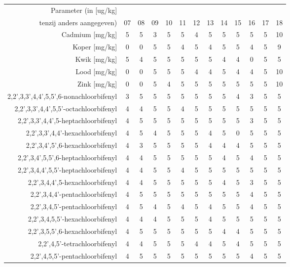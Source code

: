 \begin{tabular}{ r |c | c | c | c | c |c | c | c | c | c | c | c } 
\rowcolor[HTML]{EFEFEF}  
Parameter (in [ug/kg] &  &  &  &  &  &  &  &  &  &  &  & \\\rowcolor[HTML]{EFEFEF}  
 tenzij anders aangegeven) & 07 & 08 & 09 & 10 & 11 & 12 & 13 & 14 & 15 & 16 & 17 & 18 \\    \hline     
Cadmium [mg/kg] &5 & 5 & 3 & 5 & 5 & 4 & 5 & 5 & 5 & 5 & 5 & 10 \\
Koper [mg/kg] &0 & 0 & 5 & 5 & 4 & 5 & 4 & 5 & 5 & 4 & 5 & 9 \\
Kwik [mg/kg] &5 & 4 & 5 & 5 & 5 & 5 & 5 & 4 & 4 & 0 & 5 & 5 \\
Lood [mg/kg] &0 & 0 & 5 & 5 & 5 & 4 & 4 & 5 & 4 & 4 & 5 & 10 \\
Zink [mg/kg] &0 & 0 & 5 & 4 & 5 & 5 & 5 & 5 & 5 & 5 & 5 & 10 \\
2,2',3,3',4,4',5,5',6-nonachloorbifenyl &3 & 5 & 5 & 5 & 5 & 5 & 5 & 5 & 4 & 3 & 5 & 5 \\
2,2',3,3',4,4',5,5'-octachloorbifenyl &4 & 4 & 5 & 5 & 4 & 5 & 5 & 5 & 5 & 5 & 5 & 5 \\
2,2',3,3',4,4',5-heptachloorbifenyl &4 & 5 & 5 & 5 & 5 & 5 & 5 & 5 & 5 & 3 & 5 & 5 \\
2,2',3,3',4,4'-hexachloorbifenyl &4 & 5 & 4 & 5 & 5 & 5 & 4 & 5 & 0 & 5 & 5 & 5 \\
2,2',3,4',5',6-hexachloorbifenyl &4 & 3 & 5 & 5 & 5 & 5 & 4 & 4 & 4 & 5 & 5 & 5 \\
2,2',3,4',5,5',6-heptachloorbifenyl &4 & 4 & 5 & 5 & 5 & 5 & 5 & 4 & 5 & 4 & 5 & 5 \\
2,2',3,4,4',5,5'-heptachloorbifenyl &4 & 4 & 5 & 5 & 4 & 5 & 5 & 5 & 5 & 5 & 5 & 5 \\
2,2',3,4,4',5-hexachloorbifenyl &4 & 4 & 5 & 5 & 5 & 5 & 5 & 4 & 5 & 3 & 5 & 5 \\
2,2',3,4,4'-pentachloorbifenyl &4 & 5 & 5 & 5 & 5 & 5 & 5 & 5 & 5 & 4 & 5 & 5 \\
2,2',3,4,5'-pentachloorbifenyl &4 & 5 & 4 & 5 & 4 & 5 & 4 & 5 & 5 & 4 & 5 & 5 \\
2,2',3,4,5,5'-hexachloorbifenyl &4 & 4 & 4 & 5 & 5 & 5 & 4 & 5 & 5 & 5 & 5 & 5 \\
2,2',3,5,5',6-hexachloorbifenyl &4 & 5 & 5 & 5 & 5 & 5 & 5 & 4 & 4 & 5 & 5 & 5 \\
2,2',4,5'-tetrachloorbifenyl &4 & 4 & 5 & 5 & 5 & 4 & 4 & 5 & 4 & 5 & 5 & 5 \\
2,2',4,5,5'-pentachloorbifenyl &4 & 5 & 5 & 5 & 5 & 5 & 5 & 5 & 5 & 4 & 5 & 5 \\

\end{tabular}
